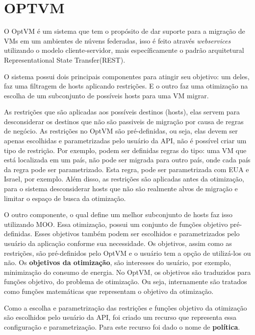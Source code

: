\chapter{OPTVM}

O OptVM é um sistema que tem o propósito de dar suporte para a migração de VMs em um ambientes de núvens federadas,
isso é feito através \textit{webservices} utilizando o modelo cliente-servidor, mais específicamente o padrão arquitetural 
Representational State Transfer(REST).

O sistema possui dois principais componentes para atingir seu objetivo: um deles, faz uma filtragem de hosts aplicando 
restrições. E o outro faz uma otimização na escolha de um subconjunto de possíveis hosts para uma VM migrar. 

As restrições que são aplicadas aos possíveis destinos (hosts), elas servem para desconsiderar os destinos 
que não são passiveis de migração por causa de regras de negócio. As restrições no 
OptVM são pré-definidas, ou seja, elas devem ser apenas escolhidas e parametrizadas pelo 
usuário da API, não é possível criar um tipo de restrição. Por exemplo, podem ser definidas regras do tipo: 
uma VM que está localizada em um país, não pode ser migrada para outro país, onde cada país
da regra pode ser parametrizado. Esta regra, pode ser parametrizada com EUA e Israel, por exemplo.
Além disso, as restrições são aplicadas antes da otimização, para o sistema desconsiderar hosts que
não são realmente alvos de migração e limitar o espaço de busca da otimização.

O outro componente, o qual define um melhor subconjunto de hosts faz isso utilizando MOO. Essa
otimização, possui um conjunto de funções objetivo pré-definidas. Esses objetivos também podem ser escolhidos
e parametrizados pelo usuário da aplicação conforme sua necessidade. Os objetivos,
assim como as restrições, são pré-definidos pelo OptVM e o usuário tem a opção de utilizá-los ou não.
Os \textbf{objetivos da otimização}, são interesses do usuário, por exemplo, minimização do consumo de energia.
No OptVM, os objetivos são traduzidos para funções objetivo, do problema de otimização. Ou seja, internamente são tratados
como funções matemáticas que representam o objetivo da otimização.

Como a escolha e parametrização das restrições e funções objetivo da otimização são escolhidos pelo usuário da API,
foi criado um recurso que representa essa configuração e parametrização. Para este recurso foi dado o nome de \textbf{política}. 

